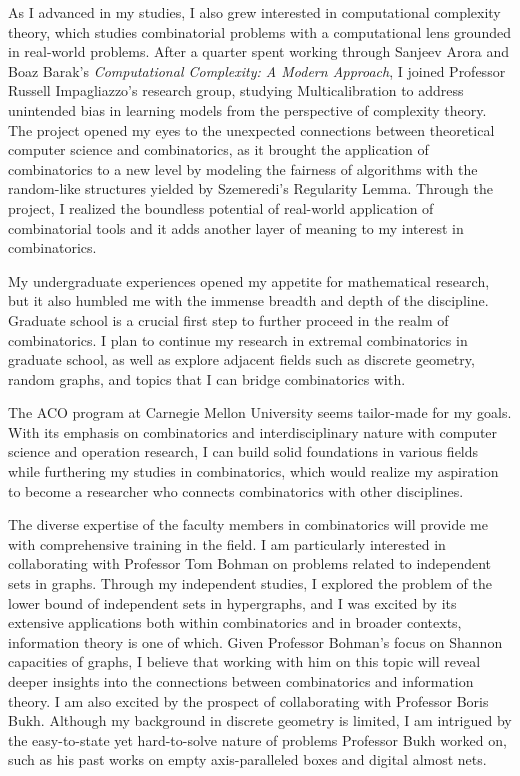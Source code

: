 \documentclass[12pt]{article}
\begin{document}
As I advanced in my studies, I also grew interested in computational complexity theory, which
studies combinatorial problems with a computational lens grounded in real-world problems. After a
quarter spent working through Sanjeev Arora and Boaz Barak's \textit{Computational Complexity: A
Modern Approach}\cite{arora2009computational}, I joined Professor Russell Impagliazzo's research
group, studying Multicalibration to address unintended bias in learning models from the perspective
of complexity theory. The project opened my eyes to the unexpected connections between theoretical
computer science and combinatorics, as it brought the application of combinatorics to a new level by
modeling the fairness of algorithms with the random-like structures yielded by Szemeredi's
Regularity Lemma. Through the project, I realized the boundless potential of real-world application
of combinatorial tools and it adds another layer of meaning to my interest in combinatorics.

My undergraduate experiences opened my appetite for mathematical research, but it also humbled me
with the immense breadth and depth of the discipline. Graduate school is a crucial first step to
further proceed in the realm of combinatorics. I plan to continue my research in extremal
combinatorics in graduate school, as well as explore adjacent fields such as discrete geometry,
random graphs, and topics that I can bridge combinatorics with.

The ACO program at Carnegie Mellon University seems tailor-made for my goals. With its emphasis on
combinatorics and interdisciplinary nature with computer science and operation research, I can build
solid foundations in various fields while furthering my studies in combinatorics, which would
realize my aspiration to become a researcher who connects combinatorics with other disciplines. 

The diverse expertise of the faculty members in combinatorics will provide me with comprehensive
training in the field. I am particularly interested in collaborating with Professor Tom Bohman on
problems related to independent sets in graphs. Through my independent studies, I explored the
problem of the lower bound of independent sets in hypergraphs, and I was excited by its extensive
applications both within combinatorics and in broader contexts, information theory is one of which.
Given Professor Bohman's focus on Shannon capacities of graphs, I believe that working with him on
this topic will reveal deeper insights into the connections between combinatorics and information
theory. I am also excited by the prospect of collaborating with Professor Boris Bukh. Although my
background in discrete geometry is limited, I am intrigued by the easy-to-state yet hard-to-solve
nature of problems Professor Bukh worked on, such as his past works on empty axis-paralleled
boxes\cite{bukh2021axisparallelboxes} and digital almost nets\cite{bukh2022digitalnets}.
\end{document}
